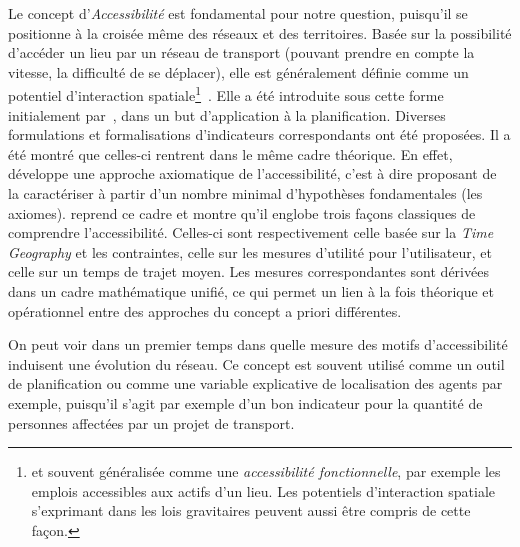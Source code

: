 {Le concept d'\emph{Accessibilité} est fondamental pour notre question, puisqu'il se positionne à la croisée même des réseaux et des territoires. Basée sur la possibilité d'accéder un lieu par un réseau de transport (pouvant prendre en compte la vitesse, la difficulté de se déplacer), elle est généralement définie comme un potentiel d'interaction spatiale\footnote{et souvent généralisée comme une \emph{accessibilité fonctionnelle}, par exemple les emplois accessibles aux actifs d'un lieu. Les potentiels d'interaction spatiale s'exprimant dans les lois gravitaires peuvent aussi être compris de cette façon.}~\cite{bavoux2005geographie}. Elle a été introduite sous cette forme initialement par~\cite{hansen1959accessibility}, dans un but d'application à la planification. Diverses formulations et formalisations d'indicateurs correspondants ont été proposées. Il a été montré que celles-ci rentrent dans le même cadre théorique. En effet, \cite{weibull1976axiomatic} développe une approche axiomatique de l'accessibilité, c'est à dire proposant de la caractériser à partir d'un nombre minimal d'hypothèses fondamentales (les axiomes). \cite{miller1999measuring} reprend ce cadre et montre qu'il englobe trois façons classiques de comprendre l'accessibilité. Celles-ci sont respectivement celle basée sur la \emph{Time Geography} et les contraintes, celle sur les mesures d'utilité pour l'utilisateur, et celle sur un temps de trajet moyen. Les mesures correspondantes sont dérivées dans un cadre mathématique unifié, ce qui permet un lien à la fois théorique et opérationnel entre des approches du concept a priori différentes.
}


\bpar{}
{
On peut voir dans un premier temps dans quelle mesure des motifs d'accessibilité induisent une évolution du réseau. Ce concept est souvent utilisé comme un outil de planification ou comme une variable explicative de localisation des agents par exemple, puisqu'il s'agit par exemple d'un bon indicateur pour la quantité de personnes affectées par un projet de transport.}


